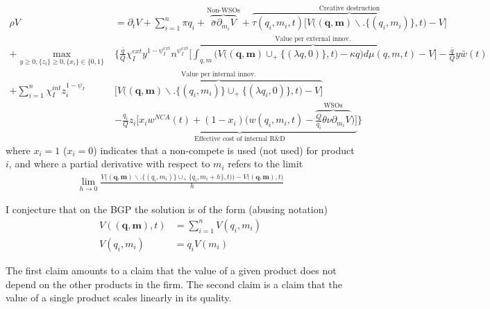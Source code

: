 \documentclass[12pt,english]{article}
\theoremstyle{remark}
\begin{document}
\small
\begin{align}
\rho V &= \partial_t V + \sum_{i=1}^n \pi q_i + \overbrace{\bar{\sigma} \partial_{m_i} V}^{\textrm{Non-WSOs}} + \overbrace{\tau(q_i,m_i,t) \Bigg[ V\Big(\mathbf{(q,m)} \backslash . \{(q_i,m_i)\},t \Big) -V  \Bigg]}^{\textrm{Creative destruction}} \nonumber \\
+ \max_{y \ge 0, \{z_{i}\} \ge 0, \{x_{i}\} \in \{0,1\}}& \Bigg\{ \frac{\bar{q}}{Q} \chi_I^{ext} y^{1-\psi_I^{ext}} n^{\psi_I^{ext}} \overbrace{\Bigg[ \int_{q,m} \Bigg( V\Big(\mathbf{(q,m)} \cup_+ \{(\lambda q,0)\},t \Big) - \kappa q  \Bigg) d\mu(q,m,t) - V   \Bigg]}^{\textrm{Value per external innov.}}- \frac{\bar{q}}{Q}y \bar{w}(t)   \nonumber \\
+ \sum_{i=1}^n \chi_I^{int} z_{i}^{1-\psi_I} &\overbrace{\Bigg[ V\Big(\mathbf{(q,m)} \backslash . \{(q_i,m_i)\} \cup_+ \{(\lambda q_i,0) \},t\Big) - V \Bigg]}^{\textrm{Value per internal innov.}}  \nonumber \\ 
&- \underbrace{\frac{q_i}{Q} z_{i} \Bigg[ x_i w^{NCA}(t) + (1-x_i) \Big( w(q_i,m_i,t) - \overbrace{ \frac{Q}{q_i} \theta \nu \partial_{m_i}V}^{\textrm{WSOs}}\Big) \Bigg]}_{\textrm{Effective cost of internal R\&D}}\Bigg\} \label{HJB_I_general}
\end{align}
\normalsize
where $x_i = 1$ ($x_i = 0$) indicates that a non-compete is used (not used) for product $i$, and where a partial derivative with respect to $m_i$ refers to the limit
\begin{align*}
\lim_{h \to 0} \frac{V\Big( (\mathbf{q},\mathbf{m} ) \backslash . \{ (q_i,m_i)\} \cup_+ \{q_i,m_i + h\},t) \Big) - V\Big((\mathbf{q},\mathbf{m}) , t\Big)}{h}
\end{align*}

I conjecture that on the BGP the solution is of the form (abusing notation)
\begin{align}
V(\mathbf{(q,m)},t) &= \sum_{i=1}^n V(q_i,m_i) \label{incumbent_guess_verify_1} \\
V(q_i,m_i) &= q_i V(m_i) \label{incumbent_guess_verify_2}
\end{align}

The first claim amounts to a claim that the value of a given product does not depend on the other products in the firm. The second claim is a claim that the value of a single product scales linearly in its quality. 
\end{document}
